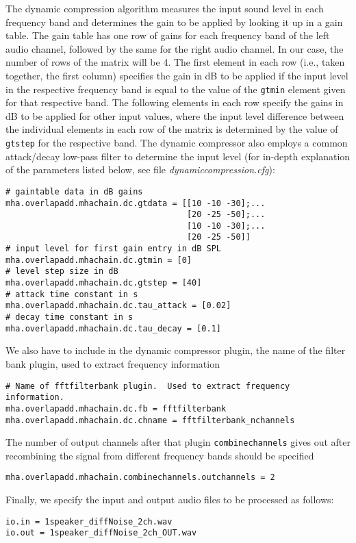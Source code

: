 %
The dynamic compression algorithm measures the input sound level in 
each frequency band and determines the gain to be applied by looking 
it up in a gain table. The gain table has one row of gains for each 
frequency band of the left audio channel, followed by the same for 
the right audio channel. In our case, the number of rows of the 
matrix will be 4.
%
The first element in each row (i.e., taken together, the first
column) specifies the gain in dB to be applied if the input level in
the respective frequency band is equal to the value of the \verb!gtmin!
element given for that respective band.
%
The following elements in each row specify the gains in dB to be
applied for other input values, where the input level difference
between the individual elements in each row of the matrix is
determined by the value of \verb!gtstep! for the respective 
band. The dynamic compressor also employs a common attack/decay low-pass filter
to determine the input level (for in-depth explanation of the parameters 
listed below, see file \emph{dynamiccompression.cfg}):
\begin{verbatim}
# gaintable data in dB gains
mha.overlapadd.mhachain.dc.gtdata = [[10 -10 -30];...
                                     [20 -25 -50];...
                                     [10 -10 -30];...
                                     [20 -25 -50]]
# input level for first gain entry in dB SPL
mha.overlapadd.mhachain.dc.gtmin = [0]
# level step size in dB
mha.overlapadd.mhachain.dc.gtstep = [40]
# attack time constant in s
mha.overlapadd.mhachain.dc.tau_attack = [0.02]
# decay time constant in s
mha.overlapadd.mhachain.dc.tau_decay = [0.1]
\end{verbatim}
%
We also have to include in the dynamic compressor plugin, the name 
of the filter bank plugin, used to extract frequency information
\begin{verbatim}
# Name of fftfilterbank plugin.  Used to extract frequency information.
mha.overlapadd.mhachain.dc.fb = fftfilterbank
mha.overlapadd.mhachain.dc.chname = fftfilterbank_nchannels
\end{verbatim}
%
The number of output channels after that plugin \verb!combinechannels! 
gives out after recombining the signal from different frequency 
bands should be specified
\begin{verbatim}
mha.overlapadd.mhachain.combinechannels.outchannels = 2
\end{verbatim}
%
Finally, we specify the input and output audio files to be processed as 
follows:
\begin{verbatim}
io.in = 1speaker_diffNoise_2ch.wav
io.out = 1speaker_diffNoise_2ch_OUT.wav
\end{verbatim}
